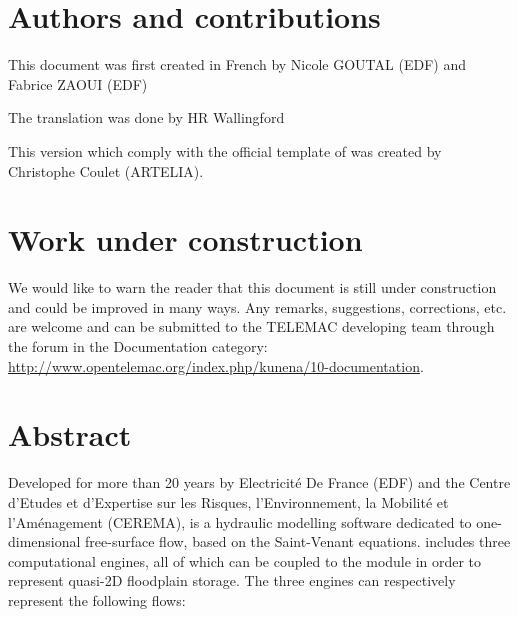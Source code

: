 \documentclass[Mascaret]{../../data/TelemacDoc} %
\begin{document}
\let\cleardoublepage\clearpage
\title{\mascaret}
\subtitle{Theory guide}
\version{\telmaversion}
\date{\today}
\maketitle
\clearpage


\newpage

\thispagestyle{empty}

\chapter*{Authors and contributions}
This document was first created in French by Nicole GOUTAL (EDF) and Fabrice ZAOUI (EDF)

The translation was done by HR Wallingford

This version which comply with the official template of \telemacsystem{} was created by Christophe Coulet (ARTELIA).

\newpage

\chapter*{Work under construction}\label{workunderconstruction}
We would like to warn the reader that this document is still under construction and
could be improved in many ways. Any remarks, suggestions, corrections, etc. are welcome
and can be submitted to the TELEMAC developing team through the forum in the Documentation
category: \url{http://www.opentelemac.org/index.php/kunena/10-documentation}.

\newpage

\chapter*{Abstract}\label{Abstract}
Developed for more than 20 years by Electricité De France (EDF) and the Centre d'Etudes et d'Expertise sur les Risques, l'Environnement, la Mobilité et l'Aménagement (CEREMA), \mascaret{} is a hydraulic modelling software dedicated to one-dimensional free-surface flow, based on the Saint-Venant equations.
\mascaret{} includes three computational engines, all of which can be coupled to the \casier{} module in order to represent quasi-2D floodplain storage. The three engines can respectively represent the following flows:
\end{document}
